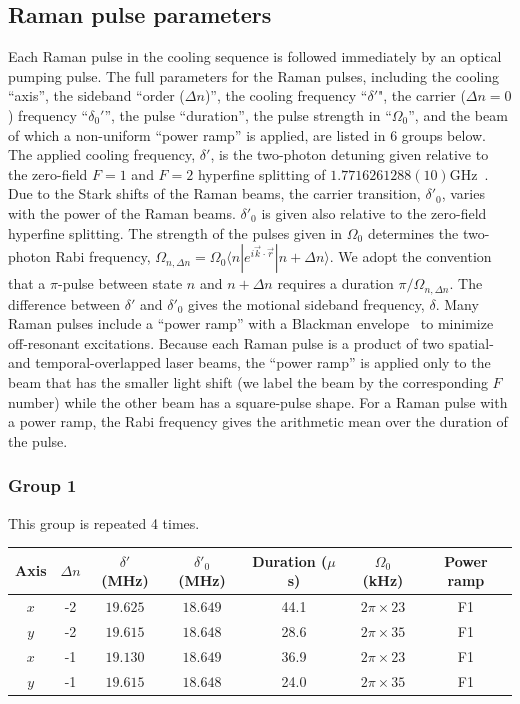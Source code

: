 \documentclass[aps,secnumarabic,amsmath,amssymb]{revtex4}
\begin{document}
\subsection{Raman pulse parameters}
Each Raman pulse in the cooling sequence is followed immediately by an optical pumping pulse.
The full parameters for the Raman pulses, including the cooling ``axis'',
the sideband ``order ($\Delta n$)'', the cooling frequency ``$\delta '$",
the carrier ($\Delta n=0$) frequency ``$\delta_0'$'', the pulse ``duration'',
the pulse strength in ``$\Omega_0$'',
and the beam of which a non-uniform ``power ramp'' is applied, are listed in 6 groups below.
The applied cooling frequency, $\delta'$,
is the two-photon detuning given relative to the zero-field $F=1$ and $F=2$ hyperfine splitting
of $1.7716261288(10)$GHz~\cite{SteckNa}.
Due to the Stark shifts of the Raman beams, the carrier transition, $\delta'_0$,
varies with the power of the Raman beams.
$\delta'_0$ is given also relative to the zero-field hyperfine splitting.
The strength of the pulses given in $\Omega_0$ determines the two-photon Rabi frequency,
$\Omega_{n,\Delta n}=\Omega_0 \langle n|e^{i \vec{k} \cdot \vec{r}}|n+\Delta n\rangle$.
We adopt the convention that a $\pi$-pulse between state $n$ and $n+\Delta n$ requires a duration $\pi/\Omega_{n,\Delta n}$.
The difference between $\delta'$ and $\delta'_0$ gives the motional sideband frequency, $\delta$.
Many Raman pulses include a ``power ramp'' with a Blackman envelope~\cite{Kasevich1992} to minimize off-resonant excitations.
Because each Raman pulse is a product of two spatial- and temporal-overlapped laser beams,
the ``power ramp'' is applied only to the beam that has the smaller light shift
(we label the beam by the corresponding $F$ number) while the other beam has a square-pulse shape.
For a Raman pulse with a power ramp,
the Rabi frequency gives the arithmetic mean over the duration of the pulse.

\newpage

\subsubsection{Group 1}
This group is repeated 4 times.
\begin{center}
  \begin{tabular}{|c|c|c|c|c|c|c|}
    \hline
    Axis&$\Delta n$&$\delta'$ (MHz)&$\delta'_0$ (MHz)&Duration ($\mu$s)& $\Omega_0$ (kHz)&Power ramp\\\hline
    $x$&-2&$19.625$&$18.649$&44.1&$2\pi\times23$&F1\\\hline
    $y$&-2&$19.615$&$18.648$&28.6&$2\pi\times35$&F1\\\hline
    $x$&-1&$19.130$&$18.649$&36.9&$2\pi\times23$&F1\\\hline
    $y$&-1&$19.615$&$18.648$&24.0&$2\pi\times35$&F1\\\hline
  \end{tabular}
\end{center}
\end{document}
